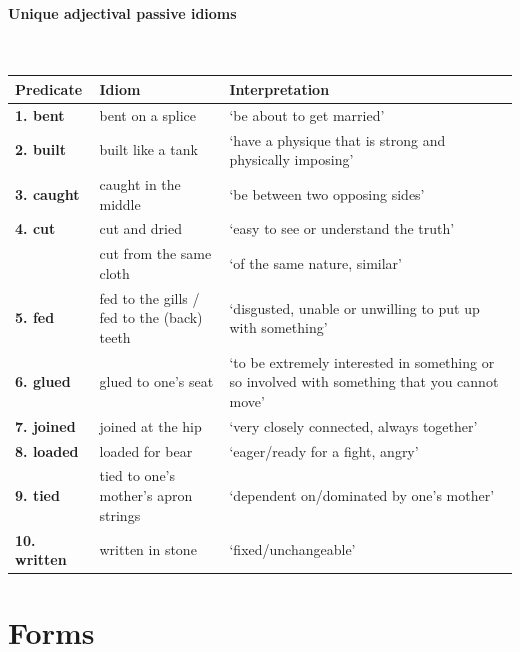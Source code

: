 \documentclass[output=paper]{langsci/langscibook}
\begin{document}
\begin{subappendices}
\paragraph*{Unique adjectival passive idioms}\leavevmode\\[.5\baselineskip]
{\smaller
\begin{tabularx}{\textwidth}{lXX}
{\bfseries Predicate} & {\bfseries Idiom} & {\bfseries Interpretation}\\
\midrule
{\bfseries 1. bent}     & {bent on a splice}                             & ‘be about to get married’\\
{\bfseries 2. built}    & {built like a tank}                            & ‘have a physique that is strong and physically imposing’\\
{\bfseries 3. caught}   & {caught in the middle}                         & ‘be between two opposing sides’ \\
{\bfseries 4. cut}      & {cut and dried}                                & ‘easy to see or understand the truth’ \\
                        & {cut from the same cloth}                      & ‘of the same nature, similar’ \\
{\bfseries 5. fed}      & {fed to the gills  / fed to the (back) teeth } & ‘disgusted, unable or unwilling to put up with something’ \\
{\bfseries 6. glued}    & {glued to one’s seat}                          & ‘to be extremely interested in something or so involved with something that you cannot move’\\
{\bfseries 7. joined}   & {joined at the hip}                            & ‘very closely connected, always together’\\
{\bfseries 8. loaded}   & { loaded for bear}                             & ‘eager/ready for a fight, angry’\\
{\bfseries 9. tied}     & { tied to one’s mother’s apron strings}        & ‘dependent on/dominated by one’s mother’ \\
{\bfseries 10. written} & { written in stone}                            & ‘fixed/unchangeable’ \\
\end{tabularx}
}

\section{Forms}\label{app-14:b}


\end{subappendices}
\end{document}
